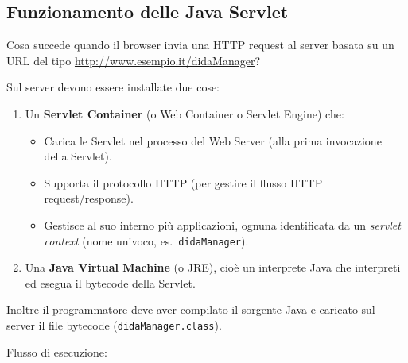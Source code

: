 \subsection{Funzionamento delle Java Servlet}

Cosa succede quando il browser invia una HTTP request al server basata su un URL del tipo \url{http://www.esempio.it/didaManager}?

Sul server devono essere installate due cose:

\begin{enumerate}
    \item Un \textbf{Servlet Container} (o Web Container o Servlet Engine) che:
    \begin{itemize}
        \item Carica le Servlet nel processo del Web Server (alla prima invocazione della Servlet).
        \item Supporta il protocollo HTTP (per gestire il flusso HTTP request/response).
        \item Gestisce al suo interno più applicazioni, ognuna identificata da un \emph{servlet context} (nome univoco, es.\ \texttt{didaManager}).
    \end{itemize}
    \item Una \textbf{Java Virtual Machine} (o JRE), cioè un interprete Java che interpreti ed esegua il bytecode della Servlet.
\end{enumerate}

Inoltre il programmatore deve aver compilato il sorgente Java e caricato sul server il file bytecode (\texttt{didaManager.class}).

Flusso di esecuzione:


